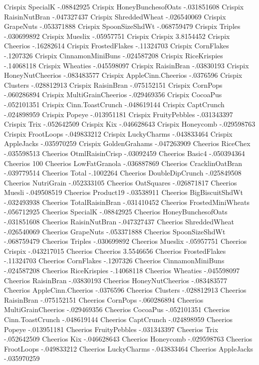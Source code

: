 Crispix	SpecialK	-.08842925
Crispix	HoneyBunchesofOats	-.031851608
Crispix	RaisinNutBran	-.047327437
Crispix	ShreddedWheat	-.026540069
Crispix	GrapeNuts	-.053371888
Crispix	SpoonSizeShdWt	-.068759479
Crispix	Triples	-.030699892
Crispix	Mueslix	-.05957751
Crispix	Crispix	3.8154452
Crispix	Cheerios	-.16282614
Crispix	FrostedFlakes	-.11324703
Crispix	CornFlakes	-.1207326
Crispix	CinnamonMiniBuns	-.024587208
Crispix	RiceKrispies	-.14068118
Crispix	Wheaties	-.045598097
Crispix	RaisinBran	-.03830193
Crispix	HoneyNutCheerios	-.083483577
Crispix	AppleCinn.Cheerios	-.0376596
Crispix	Clusters	-.028812913
Crispix	RaisinBran	-.075152151
Crispix	CornPops	-.060286894
Crispix	MultiGrainCheerios	-.029469356
Crispix	CocoaPus	-.052101351
Crispix	Cinn.ToastCrunch	-.048619144
Crispix	CaptCrunch	-.024898959
Crispix	Popeye	-.013951181
Crispix	FruityPebbles	-.031343397
Crispix	Trix	-.052642509
Crispix	Kix	-.046628643
Crispix	Honeycomb	-.029598763
Crispix	FrootLoops	-.049833212
Crispix	LuckyCharms	-.043833464
Crispix	AppleJacks	-.035970259
Crispix	GoldenGrahams	-.047263909
Cheerios	RiceChex	-.035598513
Cheerios	OtmlRaisinCrisp	-.03092459
Cheerios	Basic4	-.050394364
Cheerios	100%
Cheerios	LowFatGranola	-.036887869
Cheerios	CracklinOatBran	-.039779514
Cheerios	Total	-.1002264
Cheerios	DoubleDipCrunch	-.025849508
Cheerios	NutriGrain	-.052333105
Cheerios	OatSquares	-.026871817
Cheerios	Muesli	-.049508519
Cheerios	Product19	-.03538911
Cheerios	BigBiscuitShdWt	-.032493938
Cheerios	TotalRaisinBran	-.031410452
Cheerios	FrostedMiniWheats	-.056712925
Cheerios	SpecialK	-.08842925
Cheerios	HoneyBunchesofOats	-.031851608
Cheerios	RaisinNutBran	-.047327437
Cheerios	ShreddedWheat	-.026540069
Cheerios	GrapeNuts	-.053371888
Cheerios	SpoonSizeShdWt	-.068759479
Cheerios	Triples	-.030699892
Cheerios	Mueslix	-.05957751
Cheerios	Crispix	-.043217015
Cheerios	Cheerios	3.5546656
Cheerios	FrostedFlakes	-.11324703
Cheerios	CornFlakes	-.1207326
Cheerios	CinnamonMiniBuns	-.024587208
Cheerios	RiceKrispies	-.14068118
Cheerios	Wheaties	-.045598097
Cheerios	RaisinBran	-.03830193
Cheerios	HoneyNutCheerios	-.083483577
Cheerios	AppleCinn.Cheerios	-.0376596
Cheerios	Clusters	-.028812913
Cheerios	RaisinBran	-.075152151
Cheerios	CornPops	-.060286894
Cheerios	MultiGrainCheerios	-.029469356
Cheerios	CocoaPus	-.052101351
Cheerios	Cinn.ToastCrunch	-.048619144
Cheerios	CaptCrunch	-.024898959
Cheerios	Popeye	-.013951181
Cheerios	FruityPebbles	-.031343397
Cheerios	Trix	-.052642509
Cheerios	Kix	-.046628643
Cheerios	Honeycomb	-.029598763
Cheerios	FrootLoops	-.049833212
Cheerios	LuckyCharms	-.043833464
Cheerios	AppleJacks	-.035970259
